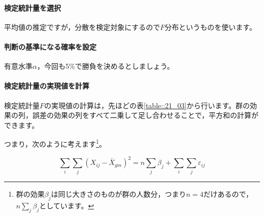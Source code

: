\documentclass{ltjbook}
\begin{document}
\paragraph{検定統計量を選択}平均値の推定ですが，分散を検定対象にするので$F$分布というものを使います。
\paragraph{判断の基準になる確率を設定}有意水準$\alpha$，今回も5\%で勝負を決めるとしましょう。
\paragraph{検定統計量の実現値を計算}検定統計量$F$の実現値の計算は，先ほどの表\ref{table::21_03}から行います。群の効果の列，誤差の効果の列をすべて二乗して足し合わせることで，平方和の計算ができます。

つまり，次のように考えます\footnote{群の効果$\beta_j$は同じ大きさのものが群の人数分，つまり$n=4$だけあるので，$n\sum_j \beta_j$としています。}。

\[\sum_{i}\sum_{j} (X_{ij} - \bar{X}_{gm})^2 = n\sum_j \beta_j + \sum_{i}\sum_{j} \varepsilon_{ij} \]
\end{document}
